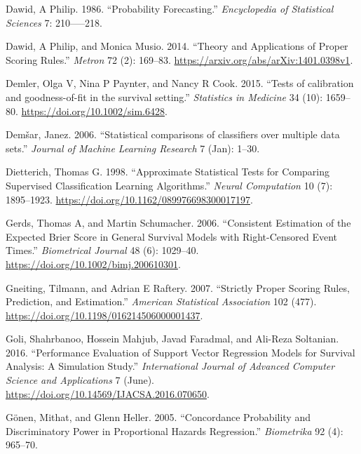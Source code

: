 \documentclass[
  letterpaper,
]{scrbook}
\newlength{\cslhangindent}
\newlength{\cslentryspacingunit} %
\newenvironment{CSLReferences}[2] %
 {%
  \setlength{\parindent}{0pt}
  \ifodd #1
  \let\oldpar\par
  \def\par{\hangindent=\cslhangindent\oldpar}
  \fi
  \setlength{\parskip}{#2\cslentryspacingunit}
 }%
 {}
\theoremstyle{plain}
\theoremstyle{definition}
\theoremstyle{remark}
\begin{document}
\begin{CSLReferences}{1}{0}
\leavevmode{}%
Dawid, A Philip. 1986. {``{Probability Forecasting}.''}
\emph{Encyclopedia of Statistical Sciences} 7: 210-----218.

\leavevmode{}%
Dawid, A Philip, and Monica Musio. 2014. {``{Theory and Applications of
Proper Scoring Rules}.''} \emph{Metron} 72 (2): 169--83.
\url{https://arxiv.org/abs/arXiv:1401.0398v1}.

\leavevmode{}%
Demler, Olga V, Nina P Paynter, and Nancy R Cook. 2015. {``{Tests of
calibration and goodness-of-fit in the survival setting}.''}
\emph{Statistics in Medicine} 34 (10): 1659--80.
\url{https://doi.org/10.1002/sim.6428}.

\leavevmode{}%
Demšar, Janez. 2006. {``{Statistical comparisons of classifiers over
multiple data sets}.''} \emph{Journal of Machine Learning Research} 7
(Jan): 1--30.

\leavevmode{}%
Dietterich, Thomas G. 1998. {``{Approximate Statistical Tests for
Comparing Supervised Classification Learning Algorithms}.''}
\emph{Neural Computation} 10 (7): 1895--1923.
\url{https://doi.org/10.1162/089976698300017197}.

\leavevmode{}%
Gerds, Thomas A, and Martin Schumacher. 2006. {``{Consistent Estimation
of the Expected Brier Score in General Survival Models with
Right-Censored Event Times}.''} \emph{Biometrical Journal} 48 (6):
1029--40. \url{https://doi.org/10.1002/bimj.200610301}.

\leavevmode{}%
Gneiting, Tilmann, and Adrian E Raftery. 2007. {``{Strictly Proper
Scoring Rules, Prediction, and Estimation}.''} \emph{American
Statistical Association} 102 (477).
\url{https://doi.org/10.1198/016214506000001437}.

\leavevmode{}%
Goli, Shahrbanoo, Hossein Mahjub, Javad Faradmal, and Ali-Reza
Soltanian. 2016. {``{Performance Evaluation of Support Vector Regression
Models for Survival Analysis: A Simulation Study}.''}
\emph{International Journal of Advanced Computer Science and
Applications} 7 (June).
\url{https://doi.org/10.14569/IJACSA.2016.070650}.

\leavevmode{}%
Gönen, Mithat, and Glenn Heller. 2005. {``{Concordance Probability and
Discriminatory Power in Proportional Hazards Regression}.''}
\emph{Biometrika} 92 (4): 965--70.


\end{CSLReferences}
\end{document}
